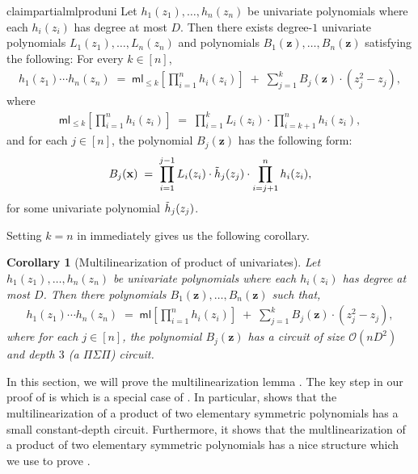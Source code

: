 \documentclass[11pt]{article}
\newtheorem{corollary}[theorem]{Corollary}
\newcommand{\bigO}{\mathcal{O}}
\newcommand{\brac}[1]{\left[ #1 \right]}
\newcommand{\ml}{\mathsf{ml}}
\begin{document}
\begin{restatable}{claim}{partialmlproduni}\label{claim:partial-multilinearize-prod-univariates}
Let $h_{1}(z_{1}),\ldots,h_{n}(z_{n})$ be univariate polynomials where each $h_{i}(z_{i})$ has degree at most $D$.\newline
Then there exists degree-$1$ univariate polynomials $L_{1}(z_{1}), \ldots, L_{n}(z_{n})$ and polynomials $B_{1}(\mathbf{z}), \ldots, B_{n}(\mathbf{z})$ satisfying the following: For every $k \in [n]$,
\begin{align*}
    h_{1}(z_{1}) \cdots h_{n}(z_{n}) \; = \; \ml_{\leq k}\brac{\prod_{i=1}^{n} h_{i}(z_{i})} \; + \; \sum_{j=1}^{k} B_{j}(\mathbf{z}) \cdot (z_{j}^{2} - z_{j}),
\end{align*}
where
\begin{align*}
    \ml_{\leq k}\brac{\prod_{i=1}^{n} h_{i}(z_{i})} \; = \; \prod_{i = 1}^{k} L_{i}(z_{i}) \cdot \prod_{i = k+1}^{n} h_{i}(z_{i}),
\end{align*}
and for each $j \in [n]$, the polynomial $B_{j}(\mathbf{z})$ has the following form:
\begin{align*}
    B_{j}(\mathbf{x}) \; = \; \prod_{i = 1}^{j-1} L_{i}(z_{i}) \cdot \Tilde{h}_{j}(z_{j}) \cdot \prod_{i = j+1}^{n} h_{i}(z_{i}),
\end{align*}
for some univariate polynomial $\Tilde{h}_{j}(z_{j})$.
\end{restatable}

\noindent
Setting $k = n$ in  immediately gives us the following corollary.
\begin{corollary}[Multilinearization of product of univariates]\label{cor:ml-prod-uni}
Let $h_{1}(z_{1}),\ldots,h_{n}(z_{n})$ be univariate polynomials where each $h_{i}(z_{i})$ has degree at most $D$.\newline
Then there polynomials $B_{1}(\mathbf{z}), \ldots, B_{n}(\mathbf{z})$ such that,
\begin{align*}
    h_{1}(z_{1}) \cdots h_{n}(z_{n}) \; = \; \ml\brac{\prod_{i=1}^{n} h_{i}(z_{i})} \; + \; \sum_{j=1}^{k} B_{j}(\mathbf{z}) \cdot (z_{j}^{2} - z_{j}),
\end{align*}
where for each $j \in [n]$, the polynomial $B_{j}(\mathbf{z})$ has a circuit of size $\bigO(nD^{2})$ and depth $3$ (a $\Pi \Sigma \Pi$) circuit.
\end{corollary}



\noindent
In this section, we will prove the multilinearization lemma . The key step in our proof of  is  which is a special case of . In particular,  shows that the multilinearization of a product of two elementary symmetric polynomials has a small constant-depth circuit. Furthermore, it shows that the multlinearization of a product of two elementary symmetric polynomials has a nice structure which we use to prove .\\ 
\end{document}
